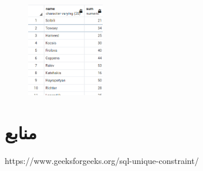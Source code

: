 \documentclass{article}
\begin{document}
\subsection{}
\begin{figure}[ht]
    \centering
    \includegraphics[width=0.3\textwidth]{figures/5-h.png}
    \caption
	{
	}
    \label{fig:fig1}
\end{figure}


\section*{منابع}
\renewcommand{\section}[2]{}%
\begin{thebibliography}{99} %


\begin{LTRitems}

\resetlatinfont

 https://www.geeksforgeeks.org/sql-unique-constraint/
\end{LTRitems}

\end{thebibliography}
\end{document}

